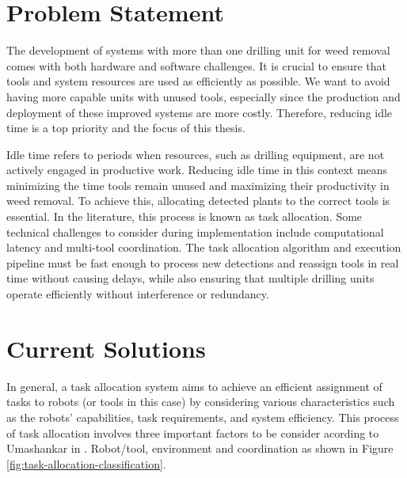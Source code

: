 \section{Problem Statement}

The development of systems with more than one drilling unit for weed removal comes with both hardware and software challenges. It is crucial to ensure that tools and system resources are used as efficiently as possible. We want to avoid having more capable units with unused tools, especially since the production and deployment of these improved systems are more costly. Therefore, reducing idle time is a top priority and the focus of this thesis.


Idle time refers to periods when resources, such as drilling equipment, are not actively engaged in productive work. Reducing idle time in this context means minimizing the time tools remain unused and maximizing their productivity in weed removal. To achieve this, allocating detected plants to the correct tools is essential. In the literature, this process is known as task allocation. Some technical challenges to consider during implementation include computational latency and multi-tool coordination. The task allocation algorithm and execution pipeline must be fast enough to process new detections and reassign tools in real time without causing delays, while also ensuring that multiple drilling units operate efficiently without interference or redundancy.

\section{Current Solutions}

In general, a task allocation system aims to achieve an efficient assignment of tasks to robots (or tools in this case) by considering various characteristics such as the robots' capabilities, task requirements, and system efficiency. This process of task allocation involves three important factors to be consider acording to Umashankar in \cite{10.1145/3700591}. Robot/tool, environment and coordination as shown in Figure \ref{fig:task-allocation-classification}. 

